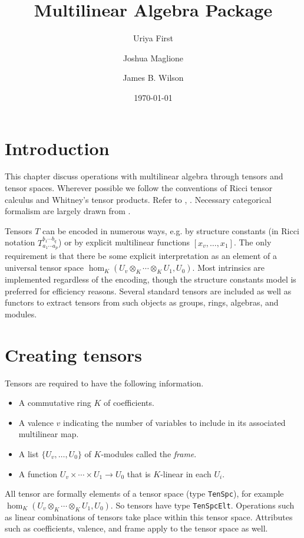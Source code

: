 \documentclass{amsart}
\title{Multilinear Algebra Package}
\author{Uriya First}
\author{Joshua Maglione}
\author{James B. Wilson}
\date{\today}
\begin{document}
\maketitle
\tableofcontents

\section{Introduction}

This chapter discuss operations with multilinear algebra through tensors 
and tensor spaces.  Wherever possible we follow the conventions
of Ricci tensor calculus and Whitney's tensor products.  Refer to 
\cite{Malcev}, \cite{Landsberg:tensors}.  Necessary categorical formalism are largely drawn from
\cite{Wilson:division}.
\medskip

Tensors $T$ can be encoded in numerous ways, e.g. by structure constants (in Ricci notation
 $T_{a_1\cdots a_p}^{b_1\cdots b_q}$) or by explicit
multilinear functions $[x_v,\dots,x_1]$.  The only requirement is that there be
some explicit interpretation as an element of a universal tensor space 
$\hom_K(U_v\otimes_K\cdots \otimes_K U_1,U_0)$.
Most intrinsics are implemented regardless of the encoding, though the structure constants model
is preferred for efficiency reasons.  Several standard tensors are included as well as functors
to extract tensors from such objects as groups, rings, algebras, and modules.

\section{Creating tensors}

Tensors are required to have the following information.
\begin{itemize}
\item A commutative ring $K$ of coefficients.
\item A valence $v$ indicating the number of variables to include in its associated multilinear map.
\item A list $\{U_v,\dots, U_0\}$ of $K$-modules called the {\em frame}.
\item A function $U_v\times \cdots \times U_1\to U_0$ that is $K$-linear in each $U_i$.
\end{itemize}
All tensor are formally elements of a tensor space (type {\tt TenSpc}), for example
$\hom_K(U_v\otimes_K\cdots \otimes_K U_1,U_0)$.  So tensors have type {\tt TenSpcElt}.
Operations such as linear combinations of tensors take place within this tensor space.
Attributes such as coefficients, valence, and frame  apply to the tensor space as well.
\end{document}
